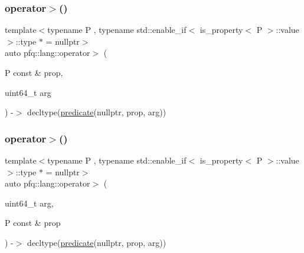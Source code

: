 \subsubsection{\texorpdfstring{operator$>$()}{operator>()}\hspace{0.1cm}{\footnotesize\ttfamily [1/2]}}
{\footnotesize\ttfamily template$<$typename P , typename std\+::enable\+\_\+if$<$ is\+\_\+property$<$ P $>$\+::value $>$\+::type $\ast$  = nullptr$>$ \\
auto pfq\+::lang\+::operator$>$ (\begin{DoxyParamCaption}\item[{P const \&}]{prop,  }\item[{uint64\+\_\+t}]{arg }\end{DoxyParamCaption}) -\/$>$ decltype(\hyperlink{namespacepfq_1_1lang_aca9adafc436b7f851621b979fa1aaf88}{predicate}(nullptr, prop, arg))
    \hspace{0.3cm}{\ttfamily [inline]}}

\mbox{\label{namespacepfq_1_1lang_a2217aa601457dcb21231ae59fe2bb8a2}} 
\subsubsection{\texorpdfstring{operator$>$()}{operator>()}\hspace{0.1cm}{\footnotesize\ttfamily [2/2]}}
{\footnotesize\ttfamily template$<$typename P , typename std\+::enable\+\_\+if$<$ is\+\_\+property$<$ P $>$\+::value $>$\+::type $\ast$  = nullptr$>$ \\
auto pfq\+::lang\+::operator$>$ (\begin{DoxyParamCaption}\item[{uint64\+\_\+t}]{arg,  }\item[{P const \&}]{prop }\end{DoxyParamCaption}) -\/$>$ decltype(\hyperlink{namespacepfq_1_1lang_aca9adafc436b7f851621b979fa1aaf88}{predicate}(nullptr, prop, arg))
    \hspace{0.3cm}{\ttfamily [inline]}}

\mbox{\label{namespacepfq_1_1lang_a8278e1cf39622e9eb4859f4720da1d16}} 
